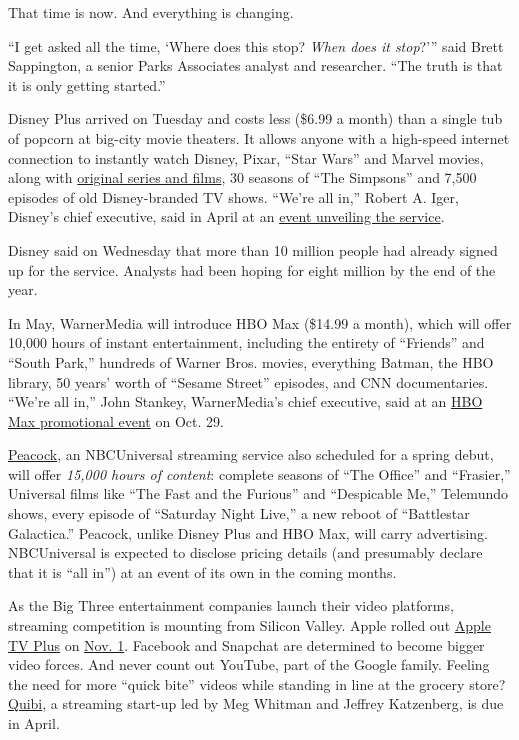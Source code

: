 That time is now. And everything is changing.

``I get asked all the time, `Where does this stop? \emph{When does it
stop}?''' said Brett Sappington, a senior Parks Associates analyst and
researcher. ``The truth is that it is only getting started.''

Disney Plus arrived on Tuesday and costs less (\$6.99 a month) than a
single tub of popcorn at big-city movie theaters. It allows anyone with
a high-speed internet connection to instantly watch Disney, Pixar,
``Star Wars'' and Marvel movies, along with
\href{https://www.nytimes3xbfgragh.onion/2019/11/07/arts/television/disney-plus-togo-noelle-lady-and-tramp.html}{original
series and films}, 30 seasons of ``The Simpsons'' and 7,500 episodes of
old Disney-branded TV shows. ``We're all in,'' Robert A. Iger, Disney's
chief executive, said in April at an
\href{https://www.nytimes3xbfgragh.onion/2019/04/11/business/media/disney-plus-streaming.html}{event
unveiling the service}.

Disney said on Wednesday that more than 10 million people had already
signed up for the service. Analysts had been hoping for eight million by
the end of the year.

In May, WarnerMedia will introduce HBO Max (\$14.99 a month), which will
offer 10,000 hours of instant entertainment, including the entirety of
``Friends'' and ``South Park,'' hundreds of Warner Bros. movies,
everything Batman, the HBO library, 50 years' worth of ``Sesame Street''
episodes, and CNN documentaries. ``We're all in,'' John Stankey,
WarnerMedia's chief executive, said at an
\href{https://www.nytimes3xbfgragh.onion/2019/10/29/business/media/hbo-max-price.html}{HBO
Max promotional event} on Oct. 29.

\href{https://www.nytimes3xbfgragh.onion/2019/09/17/business/media/peacock-nbcuniversal-streaming.html}{Peacock},
an NBCUniversal streaming service also scheduled for a spring debut,
will offer \emph{15,000 hours of content}: complete seasons of ``The
Office'' and ``Frasier,'' Universal films like ``The Fast and the
Furious'' and ``Despicable Me,'' Telemundo shows, every episode of
``Saturday Night Live,'' a new reboot of ``Battlestar Galactica.''
Peacock, unlike Disney Plus and HBO Max, will carry advertising.
NBCUniversal is expected to disclose pricing details (and presumably
declare that it is ``all in'') at an event of its own in the coming
months.

As the Big Three entertainment companies launch their video platforms,
streaming competition is mounting from Silicon Valley. Apple rolled out
\href{https://www.nytimes3xbfgragh.onion/2019/09/11/business/media/apple-tv-plus-price.html}{Apple
TV Plus} on
\href{https://www.nytimes3xbfgragh.onion/2019/10/30/business/media/apple-tv-plus.html}{Nov.
1}. Facebook and Snapchat are determined to become bigger video forces.
And never count out YouTube, part of the Google family. Feeling the need
for more ``quick bite'' videos while standing in line at the grocery
store?
\href{https://www.nytimes3xbfgragh.onion/2019/10/07/business/media/quibi-espn-katzenberg.html}{Quibi},
a streaming start-up led by Meg Whitman and Jeffrey Katzenberg, is due
in April.

